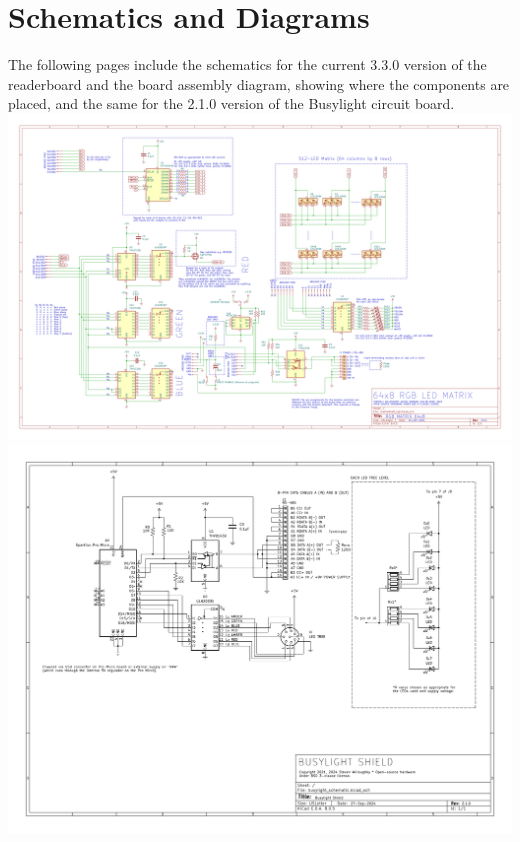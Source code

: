 \chapter{Schematics and Diagrams}
The following pages include the schematics for the current 3.3.0 version of the readerboard 
and the board assembly diagram, showing where the components are placed, and the same for the 2.1.0 version
of the Busylight circuit board.
\newpage
\noindent\includegraphics[width=\textheight,angle=90]{../hardware/matrix64x8_rgb_330_schematic.png}
\noindent\includegraphics[width=\textheight,angle=90]{images/busylight_shield_210_schematic.png}
